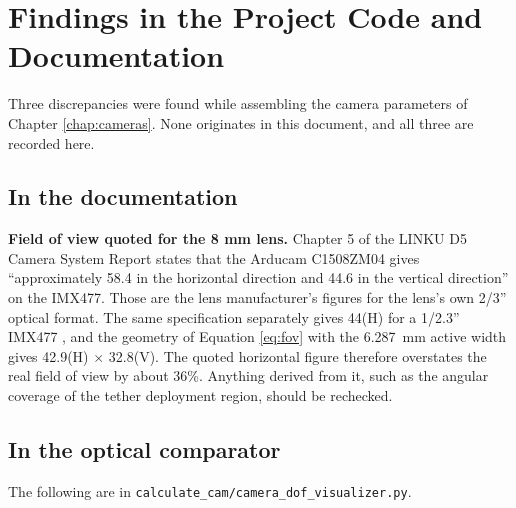 \FloatBarrier

\chapter{Findings in the Project Code and Documentation}
\label{app:findings}

Three discrepancies were found while assembling the camera parameters of Chapter \ref{chap:cameras}. None originates in this document, and all three are recorded here.

\section*{In the documentation}

\textbf{Field of view quoted for the 8 mm lens.} Chapter 5 of the LINKU D5 Camera System Report \cite{linku_d5_camera_report} states that the Arducam C1508ZM04 gives ``approximately 58.4\textdegree{} in the horizontal direction and 44.6\textdegree{} in the vertical direction'' on the IMX477. Those are the lens manufacturer's figures for the lens's own 2/3'' optical format. The same specification separately gives 44\textdegree(H) for a 1/2.3'' IMX477 \cite{arducam_c1508zm04}, and the geometry of Equation \ref{eq:fov} with the 6.287~mm active width gives 42.9\textdegree(H) $\times$ 32.8\textdegree(V). The quoted horizontal figure therefore overstates the real field of view by about 36\%. Anything derived from it, such as the angular coverage of the tether deployment region, should be rechecked.

\section*{In the optical comparator}

The following are in \texttt{calculate\_cam/camera\_dof\_visualizer.py}.

